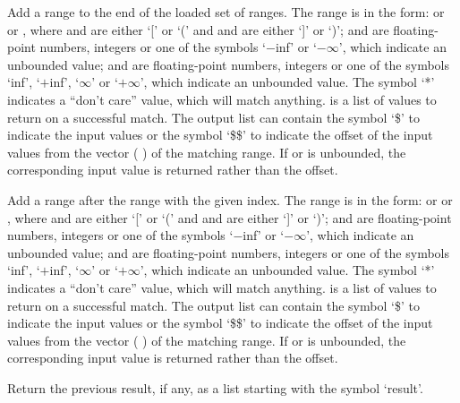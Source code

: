   Add a range to the end of the loaded set of ranges.
  The range is in the form:  or   or , where
   and  are either `[' or `(' and  and  are
  either `]' or `)';
   and  are floating-point numbers, integers or one of the symbols `$-$inf' or
  `$-\infty$', which indicate an unbounded value;
   and  are floating-point numbers, integers or one of the symbols `inf', `$+$inf',
  `$\infty$' or `$+\infty$', which indicate an unbounded value.
  The symbol `*' indicates a ``don't care'' value, which will match anything.
   is a list of values to return on a successful match.
  The output list can contain the symbol `\$' to indicate the input values or the symbol `\$\$' to
  indicate the offset of the input values from the vector ( ) of the matching range.
  If  or  is unbounded, the corresponding input value is returned rather than the offset.
  
  Add a range after the range with the given index.
  The range is in the form:  or   or , where
   and  are either `[' or `(' and  and  are
  either `]' or `)';
   and  are floating-point numbers, integers or one of the symbols `$-$inf' or
  `$-\infty$', which indicate an unbounded value;
   and  are floating-point numbers, integers or one of the symbols `inf', `$+$inf',
  `$\infty$' or `$+\infty$', which indicate an unbounded value.
  The symbol `*' indicates a ``don't care'' value, which will match anything.
   is a list of values to return on a successful match.
  The output list can contain the symbol `\$' to indicate the input values or the symbol `\$\$' to
  indicate the offset of the input values from the vector ( ) of the matching range.
  If  or  is unbounded, the corresponding input value is returned rather than the offset.

  Return the previous result, if any, as a list starting with the symbol `result'.

